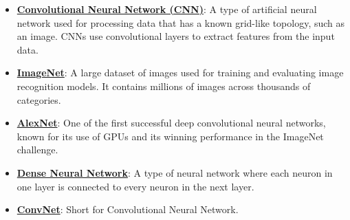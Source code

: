 \documentclass{article}%
\begin{document}
\begin{itemize}[leftmargin=*]%
\item \href{https://purdue.brightspace.com/d2l/common/assets/pdfjs-d2l-dist/1.0.14-legacy/web/viewer.html?file=\%2Fcontent\%2Fenforced\%2F1095467-wl.202510.CS.24300.001\%2F09L1-cnn.pdf\%3Fou\%3D1095467\&lang=en-us\&container=d2l-fileviewer-rendered-pdf\&fullscreen=d2l-fileviewer-rendered-pdf-dialog\&height=667#page=2}{\textbf{Convolutional Neural Network (CNN)}}: A type of artificial neural network used for processing data that has a known grid-like topology, such as an image. CNNs use convolutional layers to extract features from the input data.%
\item \href{https://purdue.brightspace.com/d2l/common/assets/pdfjs-d2l-dist/1.0.14-legacy/web/viewer.html?file=\%2Fcontent\%2Fenforced\%2F1095467-wl.202510.CS.24300.001\%2F09L1-cnn.pdf\%3Fou\%3D1095467\&lang=en-us\&container=d2l-fileviewer-rendered-pdf\&fullscreen=d2l-fileviewer-rendered-pdf-dialog\&height=667#page=3}{\textbf{ImageNet}}: A large dataset of images used for training and evaluating image recognition models. It contains millions of images across thousands of categories.%
\item \href{https://purdue.brightspace.com/d2l/common/assets/pdfjs-d2l-dist/1.0.14-legacy/web/viewer.html?file=\%2Fcontent\%2Fenforced\%2F1095467-wl.202510.CS.24300.001\%2F09L1-cnn.pdf\%3Fou\%3D1095467\&lang=en-us\&container=d2l-fileviewer-rendered-pdf\&fullscreen=d2l-fileviewer-rendered-pdf-dialog\&height=667#page=3}{\textbf{AlexNet}}: One of the first successful deep convolutional neural networks, known for its use of GPUs and its winning performance in the ImageNet challenge.%
\item \href{https://purdue.brightspace.com/d2l/common/assets/pdfjs-d2l-dist/1.0.14-legacy/web/viewer.html?file=\%2Fcontent\%2Fenforced\%2F1095467-wl.202510.CS.24300.001\%2F09L1-cnn.pdf\%3Fou\%3D1095467\&lang=en-us\&container=d2l-fileviewer-rendered-pdf\&fullscreen=d2l-fileviewer-rendered-pdf-dialog\&height=667#page=4}{\textbf{Dense Neural Network}}: A type of neural network where each neuron in one layer is connected to every neuron in the next layer.%
\item \href{https://purdue.brightspace.com/d2l/common/assets/pdfjs-d2l-dist/1.0.14-legacy/web/viewer.html?file=\%2Fcontent\%2Fenforced\%2F1095467-wl.202510.CS.24300.001\%2F09L1-cnn.pdf\%3Fou\%3D1095467\&lang=en-us\&container=d2l-fileviewer-rendered-pdf\&fullscreen=d2l-fileviewer-rendered-pdf-dialog\&height=667#page=4}{\textbf{ConvNet}}: Short for Convolutional Neural Network.%

\end{itemize}
\end{document}
